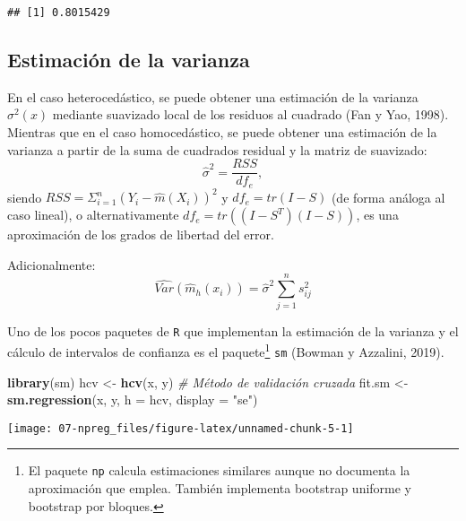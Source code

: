\documentclass[]{book}
\newenvironment{Shaded}{\begin{snugshade}}{\end{snugshade}}
\newcommand{\KeywordTok}[1]{\textcolor[rgb]{0.13,0.29,0.53}{\textbf{#1}}}
\newcommand{\DataTypeTok}[1]{\textcolor[rgb]{0.13,0.29,0.53}{#1}}
\newcommand{\StringTok}[1]{\textcolor[rgb]{0.31,0.60,0.02}{#1}}
\newcommand{\CommentTok}[1]{\textcolor[rgb]{0.56,0.35,0.01}{\textit{#1}}}
\newcommand{\OperatorTok}[1]{\textcolor[rgb]{0.81,0.36,0.00}{\textbf{#1}}}
\newcommand{\NormalTok}[1]{#1}
\theoremstyle{break}
\theoremstyle{definition}
\theoremstyle{definition}
\theoremstyle{definition}
\theoremstyle{remark}
\begin{document}
\begin{verbatim}
## [1] 0.8015429
\end{verbatim}

\subsection{Estimación de la
varianza}\label{estimaciuxf3n-de-la-varianza}

En el caso heterocedástico, se puede obtener una estimación de la
varianza \(\sigma^2(x)\) mediante suavizado local de los residuos al
cuadrado (Fan y Yao, 1998). Mientras que en el caso homocedástico, se
puede obtener una estimación de la varianza a partir de la suma de
cuadrados residual y la matriz de suavizado:
\[\hat\sigma^2 = \frac{RSS}{df_e},\] siendo
\(RSS=\Sigma_{i=1}^n \left( Y_i - \hat m(X_i) \right)^2\) y
\(df_e = tr(I - S)\) (de forma análoga al caso lineal), o
alternativamente \(df_e = tr \left( (I - S^{T})(I - S)\right)\), es una
aproximación de los grados de libertad del error.

Adicionalmente:
\[\widehat{Var}\left(\hat{m}_{h}(x_i)\right) = \hat\sigma^2\sum_{j=1}^n s^2_{ij}\]

Uno de los pocos paquetes de \texttt{R} que implementan la estimación de
la varianza y el cálculo de intervalos de confianza es el
paquete\footnote{El paquete \texttt{np} calcula estimaciones similares
  aunque no documenta la aproximación que emplea. También implementa
  bootstrap uniforme y bootstrap por bloques.} \texttt{sm} (Bowman y
Azzalini, 2019).

\begin{Shaded}
\begin{Highlighting}[]
\KeywordTok{library}\NormalTok{(sm)}
\NormalTok{hcv <-}\StringTok{ }\KeywordTok{hcv}\NormalTok{(x, y) }\CommentTok{# Método de validación cruzada}
\NormalTok{fit.sm <-}\StringTok{ }\KeywordTok{sm.regression}\NormalTok{(x, y, }\DataTypeTok{h =}\NormalTok{ hcv, }\DataTypeTok{display =} \StringTok{"se"}\NormalTok{)}
\end{Highlighting}
\end{Shaded}

\begin{center}\texttt{[image: 07-npreg\_files/figure-latex/unnamed-chunk-5-1]} \end{center}

\begin{Shaded}
\end{Shaded}
\end{document}
